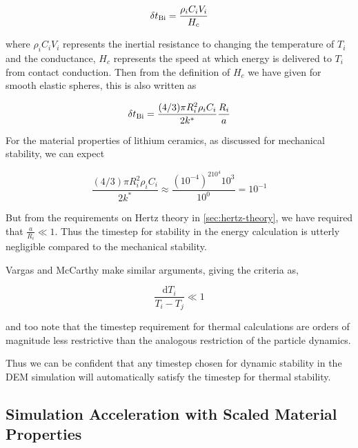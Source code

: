 \begin{equation}
	\delta t_{\mathrm{Bi}} = \frac{\rho_i C_i V_i}{H_c}
\end{equation}

where $\rho_i C_i V_i$ represents the inertial resistance to changing the temperature of $T_i$ and the conductance, $H_c$ represents the speed at which energy is delivered to $T_i$ from contact conduction. Then from the definition of $H_c$ we have given for smooth elastic spheres, this is also written as

\begin{equation}
	\delta t_{\mathrm{Bi}} = \frac{(4/3)\pi R_i^2\rho_i C_i}{2k^*}\frac{R_i}{a}
\end{equation}

For the material properties of lithium ceramics, as discussed for mechanical stability, we can expect

\begin{equation*}
	\frac{(4/3)\pi R_i^2\rho_i C_i}{2k^*} \approx \frac{(10^{-4})^210^{4}10^3}{10^0} = 10^{-1}
\end{equation*}

But from the requirements on Hertz theory in \cref{sec:hertz-theory}, we have required that $\frac{a}{R_i} \ll 1$. Thus the timestep for stability in the energy calculation is utterly negligible compared to the mechanical stability.

Vargas and McCarthy\cite{Vargas2001} make similar arguments, giving the criteria as,

\begin{equation}
	\frac{\mathrm{d}T_i}{T_i - T_j} \ll 1
\end{equation}

and too note that the timestep requirement for thermal calculations are orders of magnitude less restrictive than the analogous restriction of the particle dynamics.

Thus we can be confident that any timestep chosen for dynamic stability in the DEM simulation will automatically satisfy the timestep for thermal stability. 





\subsection{Simulation Acceleration with Scaled Material Properties}

